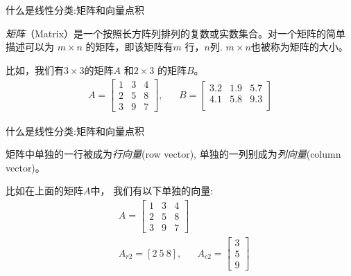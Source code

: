 \documentclass[handout]{ctexbeamer}
\begin{document}
\begin{frame}{什么是线性分类:矩阵和向量点积}
\begin{definition}
	\textit{矩阵}（Matrix）是一个按照长方阵列排列的复数或实数集合。对一个矩阵的简单描述可以为 $m \times n$ 的矩阵，即该矩阵有$m$ 行，$n$列. $m \times n$也被称为矩阵的大小。
\end{definition}

\begin{example}
比如，我们有$3 \times 3 $的矩阵$A$ 和$2 \times 3$ 的矩阵$B$。
\begin{align*}
	 A = \begin{bmatrix}
	1 & 3 & 4 \\
	2 & 5 & 8 \\
	3 & 9 & 7
\end{bmatrix}, & & B = \begin{bmatrix}
	3.2 & 1.9 & 5.7 \\
	4.1 & 5.8 & 9.3 \\
\end{bmatrix}
\end{align*}	
\end{example}
\end{frame}

\begin{frame}{什么是线性分类:矩阵和向量点积}
\begin{definition}
	矩阵中单独的一行被成为\textit{行向量}(row vector), 单独的一列别成为\textit{列向量}(column vector)。
\end{definition}
\begin{example}
比如在上面的矩阵$A$中，	我们有以下单独的向量:
\begin{align*}
 & A = \begin{bmatrix}
	1 & 3 & 4 \\
	2 & 5 & 8 \\
	3 & 9 & 7
\end{bmatrix} \\
	& A_{r2} = [2 \ 5 \ 8],   & A_{c2} = \begin{bmatrix}
		3 \\
		5 \\
		9 
	\end{bmatrix}
\end{align*}
\end{example}
\end{frame}
\end{document}
